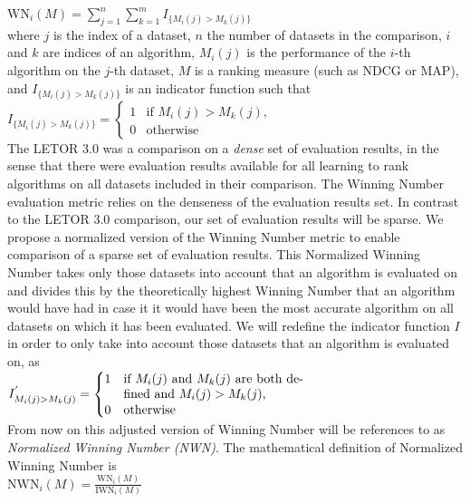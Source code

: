 \documentclass[english, authoryear, preprint]{elsarticle}
\begin{document}
$\text{WN}_i(M) = \sum\nolimits_{j=1}^n \sum\nolimits_{k=1}^m I_{\{M_i(j)>M_k(j)\}}$\\

where $j$ is the index of a dataset, $n$ the number of datasets in the comparison, $i$ and $k$ are indices of an algorithm, $M_i(j)$ is the performance of the $i$-th algorithm on the $j$-th dataset, $M$ is a ranking measure (such as NDCG or MAP), and $I_{\{M_i(j)>M_k(j)\}}$ is an indicator function such that\\

$I_{\{M_i(j)>M_k(j)\}} = \begin{cases}
1 & \text{if } M_i(j) > M_k(j), \\
0 & \text{otherwise}
\end{cases}$\\

The LETOR 3.0 was a comparison on a \emph{dense} set of evaluation results, in the sense that there were evaluation results available for all learning to rank algorithms on all datasets included in their comparison. The Winning Number evaluation metric relies on the denseness of the evaluation results set. In contrast to the LETOR 3.0 comparison, our set of evaluation results will be sparse. We propose a normalized version of the Winning Number metric to enable comparison of a sparse set of evaluation results. This Normalized Winning Number takes only those datasets into account that an algorithm is evaluated on and divides this by the theoretically highest Winning Number that an algorithm would have had in case it it would have been the most accurate algorithm on all datasets on which it has been evaluated. We will redefine the indicator function $I$ in order to only take into account those datasets that an algorithm is evaluated on, as\\

$I^{'}_{M_i(j)>M_k(j)} = \begin{cases}
1 & \parbox[t]{5cm}{if $M_i(j)$ and $M_k(j)$ are both defined and $M_i(j) > M_k(j)$,}\\
0 & \parbox[t]{5cm}{otherwise}
\end{cases}$\\

From now on this adjusted version of Winning Number will be references to as \emph{Normalized Winning Number (NWN)}. The mathematical definition of Normalized Winning Number is\\

$\text{NWN}_i(M) = \frac{\text{WN}_i(M)}{\text{IWN}_i(M)}$\\
\end{document}
